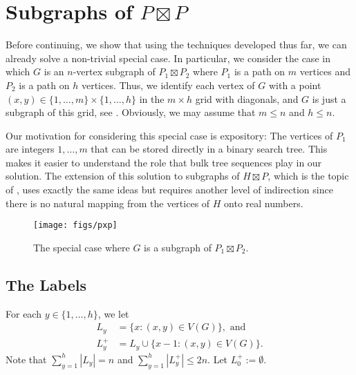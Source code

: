 \documentclass[kpfonts]{patmorin}
\let\le\leqslant
\let\leq\leqslant
\begin{document}
\section{Subgraphs of $P\boxtimes P$}

Before continuing, we show that using the techniques developed thus far, we can already solve a non-trivial special case.  In particular, we consider the case in which $G$ is an $n$-vertex subgraph of $P_1\boxtimes P_2$ where $P_1$ is a path on $m$ vertices and $P_2$ is a path on $h$ vertices.  Thus, we identify each vertex of $G$ with a point $(x,y)\in\{1,\ldots,m\}\times \{1,\ldots,h\}$ in the $m\times h$ grid with diagonals, and $G$ is just a subgraph of this grid, see .
Obviously, we may assume that $m\leq n$ and $h\leq n$.

Our motivation for considering this special case is expository: The vertices of $P_1$ are integers $1,\ldots,m$ that can be stored directly in a binary search tree. This makes it easier to understand the role that bulk tree sequences play in our solution.  The extension of this solution to subgraphs of $H\boxtimes P$, which is the topic of , uses exactly the same ideas but requires another level of indirection since there is no natural mapping from the vertices of $H$ onto real numbers.

\begin{figure}
  \begin{center}
    \texttt{[image: figs/pxp]}
  \end{center}
  \caption{The special case where $G$ is a subgraph of $P_1\boxtimes P_2$.}
\end{figure}


\subsection{The Labels}

For each $y\in\{1,\ldots,h\}$, we let
\begin{align*}
L_y&=\{x:(x,y)\in V(G)\}, \textrm{ and}\\
L^+_y&=L_y\cup\{x-1:(x,y)\in V(G)\}.
\end{align*}
Note that $\sum_{y=1}^h |L_y| = n$ and $\sum_{y=1}^h |L^+_y|\le 2n$.
Let $L^+_0:=\emptyset$.
\end{document}
